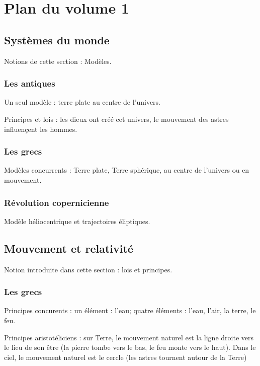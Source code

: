 \chapter{Plan du volume 1}

\section{Systèmes du monde}

Notions de cette section : Modèles.

    \subsection{Les antiques}
Un seul modèle : terre plate au centre de l'univers.

Principes et lois : les dieux ont créé cet univers, le mouvement des astres influençent les hommes.

    \subsection{Les grecs}
Modèles concurrents : Terre plate, Terre sphérique, au centre de l'univers ou en mouvement.


    \subsection{Révolution copernicienne}

Modèle héliocentrique et trajectoires éliptiques.

\section{Mouvement et relativité}

Notion introduite dans cette section : lois et principes.

    \subsection{Les grecs}

Principes concurents : un élément : l'eau; quatre éléments  : l'eau, l'air, la terre, le feu.

Principes aristotéliciens : sur Terre, le mouvement naturel est la ligne droite vers le lieu de son être (la pierre tombe vers le bas, le feu monte vers le haut). Dans le ciel, le mouvement naturel est le cercle (les astres tournent autour de la Terre)

